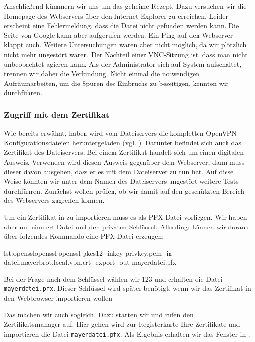 Anschließend kümmern wir uns um das geheime Rezept. Dazu versuchen wir die
Homepage des Webservers über den Internet-Explorer zu erreichen. Leider
erscheint eine Fehlermeldung, dass die Datei nicht gefunden werden kann. Die
Seite von Google kann aber aufgerufen werden. Ein Ping auf den Webserver klappt
auch. Weitere Untersuchungen waren aber nicht möglich, da wir plötzlich nicht
mehr ungestört waren. Der Nachteil einer VNC-Sitzung ist, dass man nicht
unbeobachtet agieren kann. Als der Administrator sich auf System aufschaltet,
trennen wir daher die Verbindung. Nicht einmal die notwendigen Aufräumarbeiten,
um die Spuren des Einbruchs zu beseitigen, konnten wir durchführen.

\subsubsection{Zugriff mit dem Zertifikat}

Wie bereits erwähnt, haben wird vom Dateiservers die kompletten
OpenVPN-Konfigurationsdateien heruntergeladen
(vgl. ). Darunter befindet sich auch das Zertifikat
des Dateiservers. Bei einem Zertifikat handelt sich um einen digitalen
Ausweis. Verwenden wird diesen Ausweis gegenüber dem Webserver, dann muss dieser
davon ausgehen, dass er es mit dem Dateiserver zu tun hat. Auf diese Weise
könnten wir unter dem Namen des Dateiservers ungestört weitere Tests
durchführen. Zunächst wollen prüfen, ob wir damit auf den geschützten Bereich
des Webservers zugreifen können.


Um ein Zertifikat in \Firefox{} zu importieren muss es als PFX-Datei
vorliegen. Wir haben aber nur eine crt-Datei und den privaten
Schlüssel. Allerdings können wir daraus über folgendes Kommando eine PFX-Datei
erzeugen:

\begin{MetasploitCode}{lst:openssl}{openssl}
openssl pkcs12 -inkey privkey.pem -in datei.mayerbrot.local.vpn.crt -export -out mayerdatei.pfx
\end{MetasploitCode}

Bei der Frage nach dem Schlüssel wählen wir 123 und erhalten die Datei
\texttt{mayerdatei.pfx}. Dieser Schlüssel wird später benötigt, wenn wir das
Zertifikat in den Webbrowser importieren wollen.

Das machen wir auch sogleich. Dazu starten wir \Firefox{} und rufen den
Zertifikatsmanager auf. Hier gehen wird zur Registerkarte \glqq{}Ihre
Zertifikate\grqq{} und importieren die Datei \texttt{mayerdatei.pfx}. Als
Ergebnis erhalten wir das Fenster in .

